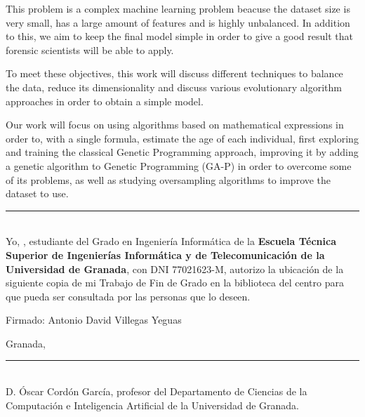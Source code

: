This problem is a complex machine learning problem beacuse the dataset size is very small, has a large amount of features and is highly unbalanced. In addition to this, we aim to keep the final model simple in order to give a good result that forensic scientists will be able to apply.


To meet these objectives, this work will discuss different techniques to balance the data, reduce its dimensionality and discuss various evolutionary algorithm approaches in order to obtain a simple model.



Our work will focus on using algorithms based on mathematical expressions in order to, with a single formula, estimate the age of each individual, first exploring and training the classical Genetic Programming approach, improving it by adding a genetic algorithm to Genetic Programming (GA-P) in order to overcome some of its problems, as well as studying oversampling algorithms to improve the dataset to use.



\newpage

\vspace*{2cm}

\rule{\linewidth}{1 mm} \\[1 cm]

{\large Yo, \textbf{\theauthor}, estudiante del Grado en Ingeniería Informática de la \textbf{Escuela Técnica Superior de Ingenierías Informática y de Telecomunicación de la Universidad de Granada}, con DNI 77021623-M, autorizo la ubicación de la siguiente copia de mi Trabajo de Fin de Grado en la biblioteca del centro para que pueda ser consultada por las personas que lo deseen.}

\vspace{7cm}

Firmado: Antonio David Villegas Yeguas

\vspace{2cm}

Granada, \thedate



\newpage

\vspace*{2cm}

\rule{\linewidth}{1 mm} \\[1 cm]

D. Óscar Cordón García, profesor del Departamento de Ciencias de la Computación e Inteligencia Artificial de la Universidad de Granada.

